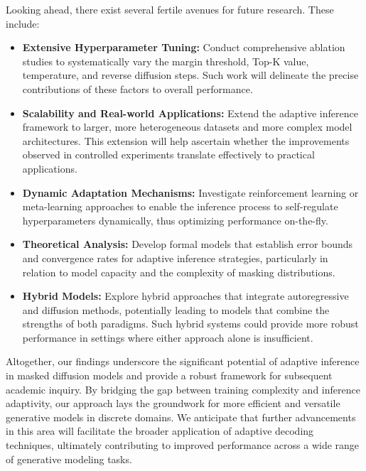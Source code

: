 \documentclass{article}
\begin{document}
Looking ahead, there exist several fertile avenues for future research. These include:
\begin{itemize}
    \item \textbf{Extensive Hyperparameter Tuning:} Conduct comprehensive ablation studies to systematically vary the margin threshold, Top-K value, temperature, and reverse diffusion steps. Such work will delineate the precise contributions of these factors to overall performance.
    \item \textbf{Scalability and Real-world Applications:} Extend the adaptive inference framework to larger, more heterogeneous datasets and more complex model architectures. This extension will help ascertain whether the improvements observed in controlled experiments translate effectively to practical applications.
    \item \textbf{Dynamic Adaptation Mechanisms:} Investigate reinforcement learning or meta-learning approaches to enable the inference process to self-regulate hyperparameters dynamically, thus optimizing performance on-the-fly.
    \item \textbf{Theoretical Analysis:} Develop formal models that establish error bounds and convergence rates for adaptive inference strategies, particularly in relation to model capacity and the complexity of masking distributions.
    \item \textbf{Hybrid Models:} Explore hybrid approaches that integrate autoregressive and diffusion methods, potentially leading to models that combine the strengths of both paradigms. Such hybrid systems could provide more robust performance in settings where either approach alone is insufficient.
\end{itemize}
Altogether, our findings underscore the significant potential of adaptive inference in masked diffusion models and provide a robust framework for subsequent academic inquiry. By bridging the gap between training complexity and inference adaptivity, our approach lays the groundwork for more efficient and versatile generative models in discrete domains. We anticipate that further advancements in this area will facilitate the broader application of adaptive decoding techniques, ultimately contributing to improved performance across a wide range of generative modeling tasks.
\end{document}
